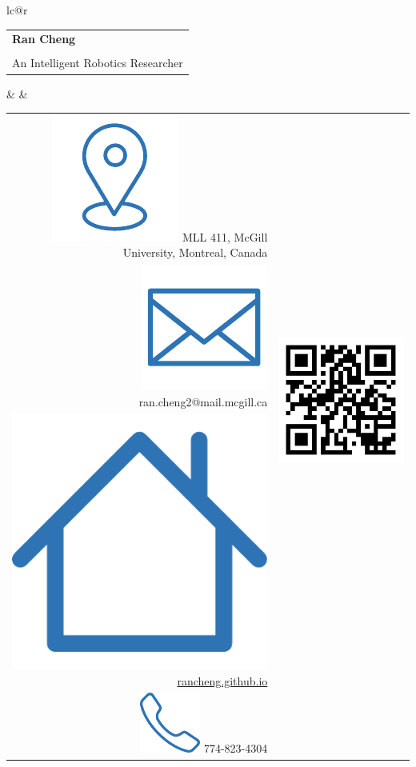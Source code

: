 \documentclass[letterpaper,10pt]{article}
\begin{document}

\begin{table}[]
\begin{tabular*}{\textwidth}{lc@{\extracolsep{\fill}}r}
\begin{tabular}{l}
\textbf{\huge \textcolor{titleblue}{Ran Cheng}} \\
\\
An Intelligent Robotics Researcher   
\end{tabular}  &  & \begin{tabular}{@{}rr@{}} \textcolor{titleblue}{\includegraphics[width=0.017\linewidth]{imgs/location(1).pdf}} MLL 411, McGill University, Montreal, Canada & \multirow{3}{*}{\includegraphics[width=0.096\linewidth]{imgs/githubpage.pdf}} \\
\includegraphics[width=0.017\linewidth]{imgs/email(1).pdf} ran.cheng2@mail.mcgill.ca                     &                   \\
\includegraphics[width=0.017\linewidth]{imgs/home(1).pdf} \href{http://rancheng.github.io}{rancheng.github.io}                            &                   \\
\includegraphics[width=0.017\linewidth]{imgs/phone(1).pdf} 774-823-4304                                  &                   
\end{tabular}  \\ 
\end{tabular*}
\end{table}

\vspace*{-10mm}
\end{document}
